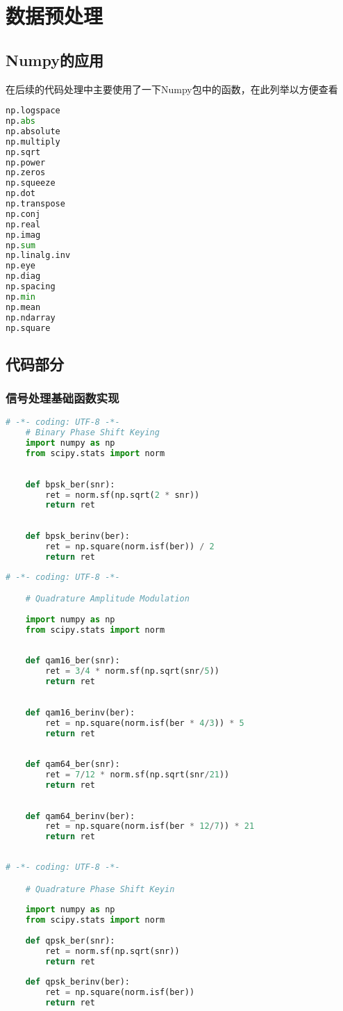 \documentclass[UTF8]{article}
\begin{document}
\section{数据预处理}
\subsection{Numpy的应用}
在后续的代码处理中主要使用了一下Numpy包中的函数，在此列举以方便查看
\begin{lstlisting}[language=Python]
np.logspace
np.abs
np.absolute
np.multiply
np.sqrt
np.power
np.zeros
np.squeeze
np.dot
np.transpose
np.conj
np.real
np.imag
np.sum
np.linalg.inv
np.eye
np.diag
np.spacing
np.min
np.mean
np.ndarray
np.square
\end{lstlisting}
\subsection{代码部分}
\subsubsection{信号处理基础函数实现}
\begin{lstlisting}[language=Python, caption=bpsk.py]
    # -*- coding: UTF-8 -*-
    # Binary Phase Shift Keying
    import numpy as np
    from scipy.stats import norm
    
    
    def bpsk_ber(snr):
        ret = norm.sf(np.sqrt(2 * snr))
        return ret
    
    
    def bpsk_berinv(ber):
        ret = np.square(norm.isf(ber)) / 2
        return ret    
\end{lstlisting}
\begin{lstlisting}[language=Python, caption=qam.py]
    # -*- coding: UTF-8 -*-

    # Quadrature Amplitude Modulation
    
    import numpy as np
    from scipy.stats import norm
    
    
    def qam16_ber(snr):
        ret = 3/4 * norm.sf(np.sqrt(snr/5))
        return ret
    
    
    def qam16_berinv(ber):
        ret = np.square(norm.isf(ber * 4/3)) * 5
        return ret
    
    
    def qam64_ber(snr):
        ret = 7/12 * norm.sf(np.sqrt(snr/21))
        return ret
    
    
    def qam64_berinv(ber):
        ret = np.square(norm.isf(ber * 12/7)) * 21
        return ret
    
\end{lstlisting}
\begin{lstlisting}[language=Python, caption=qpsk.py]
    # -*- coding: UTF-8 -*-

    # Quadrature Phase Shift Keyin
    
    import numpy as np
    from scipy.stats import norm
    
    def qpsk_ber(snr):
        ret = norm.sf(np.sqrt(snr))
        return ret
    
    def qpsk_berinv(ber):
        ret = np.square(norm.isf(ber))
        return ret
\end{lstlisting}
\end{document}
